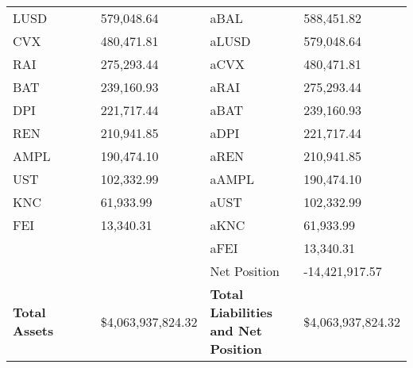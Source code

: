 \begin{longtable}{@{}p{0.25\linewidth}p{0.25\linewidth}p{0.25\linewidth}p{0.25\linewidth}@{}}
LUSD & 579,048.64 & aBAL & 588,451.82 \\
CVX & 480,471.81 & aLUSD & 579,048.64 \\
RAI & 275,293.44 & aCVX & 480,471.81 \\
BAT & 239,160.93 & aRAI & 275,293.44 \\
DPI & 221,717.44 & aBAT & 239,160.93 \\
REN & 210,941.85 & aDPI & 221,717.44 \\
AMPL & 190,474.10 & aREN & 210,941.85 \\
UST & 102,332.99 & aAMPL & 190,474.10 \\
KNC & 61,933.99 & aUST & 102,332.99 \\
FEI & 13,340.31 & aKNC & 61,933.99 \\
 &  & aFEI & 13,340.31 \\
 &  & Net Position & -14,421,917.57 \\

\midrule

\textbf{Total Assets} & \$4,063,937,824.32 & \textbf{Total Liabilities and Net Position} & \$4,063,937,824.32 \\

\bottomrule

\end{longtable}
